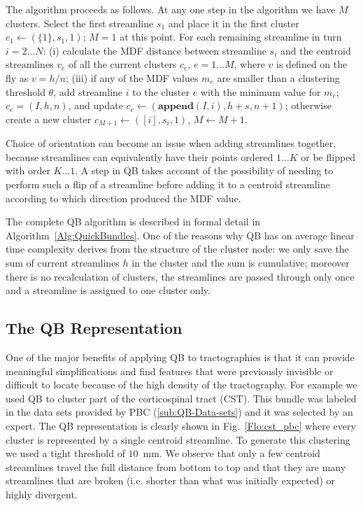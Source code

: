 \documentclass{bioinfo}
\begin{document}
\begin{methods}
The algorithm proceeds as follows.  At any one step in the algorithm we
have $M$ clusters. Select the first streamline $s_{1}$ and place it in
the first cluster $c_{1}\leftarrow(\{1\}, s_{1},1)$; $M=1$ at this
point.  For each remaining streamline in turn $i = 2 \dots N$: (i)
calculate the MDF distance between streamline $s_{i}$ and the centroid
streamlines $v_{e}$ of all the current clusters $c_{e}$, $e = 1 \dots
M$, where $v$ is defined on the fly as $v=h/n$; (iii) if any of the MDF
values $m_{e}$ are smaller than a clustering threshold $\theta$, add
streamline $i$ to the cluster $e$ with the minimum value for $m_{e}$;
$c_{e}=(I,h,n)$, and update $c_{e}\leftarrow(\mathbf{append}(I,i), h+s,
n+1)$; otherwise create a new cluster $c_{M+1}\leftarrow([i],s_{i},1)$,
$M\leftarrow M+1$.

Choice of orientation can become an issue when adding streamlines
together, because streamlines can equivalently have their points ordered
$1 \dots K$ or be flipped with order $K \dots 1$.  A step in QB takes
account of the possibility of needing to perform such a flip of a
streamline before adding it to a centroid streamline according to which
direction produced the MDF value.

The complete QB algorithm is described in formal detail in
Algorithm~\ref{Alg:QuickBundles}.  One of the reasons why
QB has on average linear time complexity derives from the structure of
the cluster node: we only save the sum of current streamlines
$h$ in the cluster and the sum is cumulative; moreover there is
no recalculation of clusters, the streamlines are passed through only
once and a streamline is assigned to one cluster only.

\subsection{The QB Representation\label{QB_Representation}}

One of the major benefits of applying QB to tractographies is that it
can provide meaningful simplifications and find features that were
previously invisible or difficult to locate because of the high density
of the tractography. For example we used QB to cluster part of the
corticospinal tract (CST). This bundle was labeled in the data sets
provided by PBC (\ref{sub:QB-Data-sets}) and it was selected by an
expert. The QB representation is clearly shown in Fig.~\ref{Flo:cst_pbc}
where every cluster is represented by a single centroid streamline. To
generate this clustering we used a tight threshold of $10$~mm. We
observe that only a few centroid streamlines travel the full distance
from bottom to top and that they are many streamlines that are broken
(i.e. shorter than what was initially expected) or highly divergent.


\end{methods}
\end{document}
